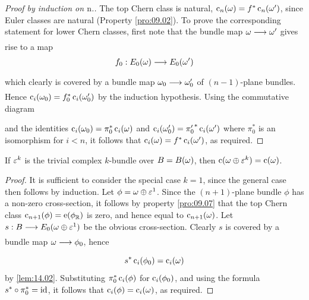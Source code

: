 \documentclass[../main]{subfiles}
\begin{document}
\begin{proof}[Proof by induction on $\mathrm{n}$.]
The top Chern class is natural, $\operatorname{c}_n(\omega) = f^\ast \operatorname{c}_n(\omega^\prime)$, since Euler classes are natural (Property \ref{pro:09.02}). To prove the corresponding statement for lower Chern classes, first note that the bundle map $\omega\varrightarrow{}\omega^\prime$ gives rise to a map \[f_0:\total_0(\omega)\varrightarrow{}\total_0(\omega^\prime)\] which clearly is covered by a bundle map $\omega_0\varrightarrow{}\omega_0^\prime$ of $(n-1)$-plane bundles. Hence $\operatorname{c}_i(\omega_0) = f^\ast_0\operatorname{c}_i(\omega_0^\prime)$ by the induction hypothesis. Using the commutative diagram

\begin{figure}[h]
\centering
{}
\end{figure}

\noindent and the identities $\operatorname{c}_i(\omega_0)=\pi^\ast_0 \operatorname{c}_i(\omega)$ and $\operatorname{c}_i(\omega_0^\prime)={\pi_0^\prime}^\ast \operatorname{c}_i(\omega^\prime)$ where $\pi_0^\ast$ is an isomorphism for $i<n$, it follows that $\operatorname{c}_i(\omega) = f^\ast \operatorname{c}_i(\omega^\prime)$, as required.
\end{proof}
\begin{lemma}
\label{lem:14.03}
If $\varepsilon^k$ is the trivial complex $k$-bundle over $B = B(\omega)$, then \newline $\operatorname{c}(\omega \oplus \varepsilon^k) = \operatorname{c}(\omega)$.
\end{lemma}
\begin{proof}
It is sufficient to consider the special case $k=1$, since the general case then follows by induction. Let $\phi = \omega\oplus\varepsilon^1$. Since the $(n+1)$-plane bundle $\phi$ has a non-zero cross-section, it follows by property \ref{pro:09.07} that the top Chern class $\operatorname{c}_{n+1}(\phi) = \operatorname{e}(\phi_\mathbb R)$ is zero, and hence equal to $\operatorname{c}_{n+1}(\omega)$. Let $s:\B\varrightarrow{} \total_0(\omega\oplus\trivialbundle^1)$ be the obvious cross-section. Clearly $s$ is covered by a bundle map $\omega\varrightarrow{} \phi_0$, hence \[s^\ast \operatorname{c}_i(\phi_0)=\operatorname{c}_i(\omega)\] by \ref{lem:14.02}. Substituting $\pi^\ast_0 \operatorname{c}_i(\phi)$ for $\operatorname{c}_i(\phi_0)$, and using the formula $s^\ast \circ \pi_0^\ast = \operatorname{id}$, it follows that $\operatorname{c}_i(\phi) = \operatorname{c}_i(\omega)$, as required. 
\end{proof}
\end{document}
